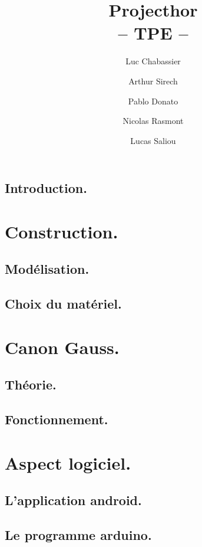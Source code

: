 \documentclass{report}
\title{Projecthor\\-- TPE --}
\author{Luc Chabassier \and Arthur Sirech \and Pablo Donato \and Nicolas Rasmont \and Lucas Saliou}
\begin{document}
\maketitle

\tableofcontents

\chapter{Introduction.} \label{intro}


\part{Construction.}
\chapter{Modélisation.} \label{moter}


\chapter{Choix du matériel.} \label{mater} %


\part{Canon Gauss.}
\chapter{Théorie.} \label{gauss}


\chapter{Fonctionnement.} \label{fonc}


\part{Aspect logiciel.}
\chapter{L'application android.} \label{andro}


\chapter{Le programme arduino.} \label{ardui}

\end{document}
